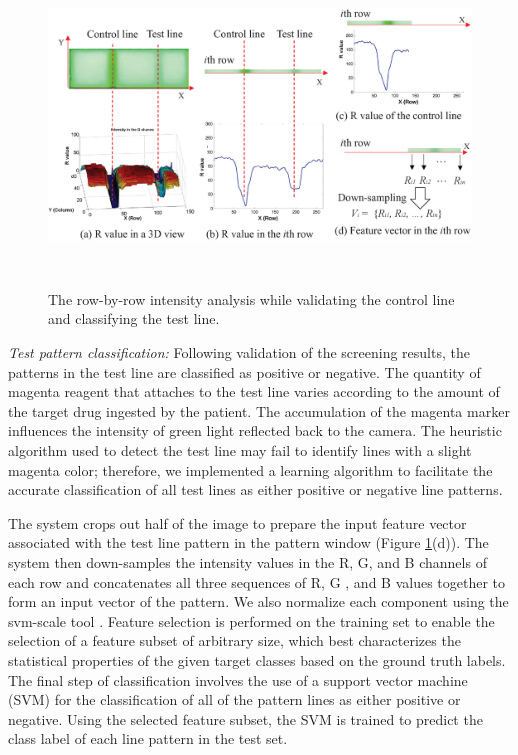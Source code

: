 \begin{figure}[ht]
\begin{center}
\includegraphics[height=8.5cm]{image/ket/row_by_row.eps}
\caption{The row-by-row intensity analysis while validating the control line and classifying the test line.}
\label{fig:row_by_row}
\end{center}
\end{figure}

%


\emph{Test pattern classification: }
Following validation of the screening results, the patterns in the test line are classified as positive or negative. The quantity of magenta reagent that attaches to the test line varies according to the amount of the target drug ingested by the patient. The accumulation of the magenta marker influences the intensity of green light reflected back to the camera. The heuristic algorithm used to detect the test line may fail to identify lines with a slight magenta color; therefore, we implemented a learning algorithm to facilitate the accurate classification of all test lines as either positive or negative line patterns.

The system crops out half of the image to prepare the input feature vector associated with the test line pattern in the pattern window (Figure \ref{fig:row_by_row}(d)). The system then down-samples the intensity values in the R, G, and B channels of each row and concatenates all three sequences of R, G , and B values together to form an input vector of the pattern. We also normalize each component using the svm-scale tool \cite{Chang:2011}. Feature selection is performed on the training set to enable the selection of a feature subset of arbitrary size, which best characterizes the statistical properties of the given target classes based on the ground truth labels. The final step of classification involves the use of a support vector machine (SVM) \cite{Chang:2011} for the classification of  all of the pattern lines as either positive or negative. Using the selected feature subset, the SVM is trained to predict the class label of each line pattern in the test set.

